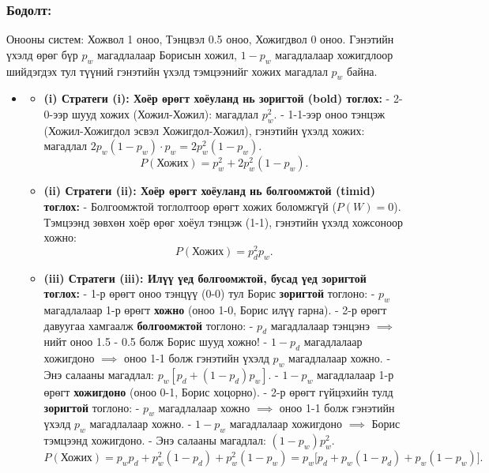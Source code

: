 \documentclass[11pt,a4paper]{article}
\begin{document}
\subsubsection*{Бодолт:}

Онооны систем: Хожвол 1 оноо, Тэнцвэл 0.5 оноо, Хожигдвол 0 оноо.
Гэнэтийн үхэлд өрөг бүр $p_w$ магадлалаар Борисын хожил, $1 - p_w$ магадлалаар хожигдлоор шийдэгдэх тул түүний гэнэтийн үхэлд тэмцээнийг хожих магадлал $p_w$ байна.

\begin{itemize}[leftmargin=1.4em, itemsep=3pt]
  \item[\textbf{(a)}]
  \begin{itemize}[itemsep=2pt]
    \item \textbf{(i) Стратеги (i): Хоёр өрөгт хоёуланд нь зоригтой (bold) тоглох:}
      - 2-0-ээр шууд хожих (Хожил-Хожил): магадлал $p_w^2$.
      - 1-1-ээр оноо тэнцэж (Хожил-Хожигдол эсвэл Хожигдол-Хожил), гэнэтийн үхэлд хожих: магадлал $2p_w(1 - p_w) \cdot p_w = 2p_w^2(1 - p_w)$.
      \[
        P(\text{Хожих}) = p_w^2 + 2p_w^2(1 - p_w).
      \]

    \item \textbf{(ii) Стратеги (ii): Хоёр өрөгт хоёуланд нь болгоомжтой (timid) тоглох:}
      - Болгоомжтой тоглолтоор өрөгт хожих боломжгүй ($P(W)=0$). Тэмцээнд зөвхөн хоёр өрөг хоёул тэнцэж (1-1), гэнэтийн үхэлд хожсоноор хожно:
      \[
        P(\text{Хожих}) = p_d^2 p_w.
      \]

    \item \textbf{(iii) Стратеги (iii): Илүү үед болгоомжтой, бусад үед зоригтой тоглох:}
      - 1-р өрөгт оноо тэнцүү (0-0) тул Борис 				\textbf{зоригтой} тоглоно:
        - $p_w$ магадлалаар 1-р өрөгт 				\textbf{хожно} (оноо 1-0, Борис илүү гарна).
          - 2-р өрөгт давуугаа хамгаалж 				\textbf{болгоомжтой} тоглоно:
            - $p_d$ магадлалаар тэнцэнэ $\implies$ нийт оноо 1.5 - 0.5 болж Борис шууд хожно!
            - $1 - p_d$ магадлалаар хожигдоно $\implies$ оноо 1-1 болж гэнэтийн үхэлд $p_w$ магадлалаар хожно.
            - Энэ салааны магадлал: $p_w [p_d + (1 - p_d)p_w]$.
        - $1 - p_w$ магадлалаар 1-р өрөгт 				\textbf{хожигдоно} (оноо 0-1, Борис хоцорно).
          - 2-р өрөгт гүйцэхийн тулд 				\textbf{зоригтой} тоглоно:
            - $p_w$ магадлалаар хожно $\implies$ оноо 1-1 болж гэнэтийн үхэлд $p_w$ магадлалаар хожно.
            - $1 - p_w$ магадлалаар хожигдоно $\implies$ Борис тэмцээнд хожигдоно.
            - Энэ салааны магадлал: $(1 - p_w) p_w^2$.
      \[
        P(\text{Хожих}) = p_w p_d + p_w^2(1 - p_d) + p_w^2(1 - p_w) = p_w \big[ p_d + p_w(1 - p_d) + p_w(1 - p_w) \big].
      \]
  \end{itemize}


\end{itemize}
\end{document}
